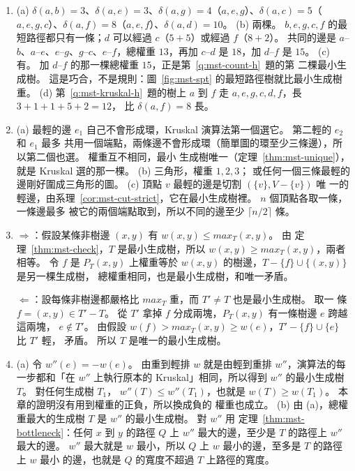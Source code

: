 \begin{enumerate}
\item (a) $\delta(a, b) = 3$、$\delta(a, e) = 3$、$\delta(a, g) = 4$（$a, e, g$）、$\delta(a, c) =
5$（$a, e, g, c$）、$\delta(a, f) = 8$（$a, e, f$）、$\delta(a, d) = 10$。 (b) 兩棵。 $b, e, g, c,
f$ 的最短路徑都只有一條；$d$ 可以經過 $c$（$5 + 5$）或經過 $f$（$8 + 2$）。 共同的邊是
$a$--$b$、$a$--$e$、$e$--$g$、$g$--$c$、$e$--$f$，總權重 $13$，再加 $c$--$d$ 是 $18$，加
$d$--$f$ 是 $15$。 (c) 有。 加 $d$--$f$ 的那一棵總權重 $15$，正是第~\ref{q:mst-count-h}~題的第
二棵最小生成樹。 這是巧合，不是規則：圖~\ref{fig:mst-spt} 的最短路徑樹就比最小生成樹重。 (d)
第~\ref{q:mst-kruskal-h}~題的樹上 $a$ 到 $f$ 走 $a, e, g, c, d, f$，長 $3 + 1 + 1 + 5 + 2 = 12$，
比 $\delta(a, f) = 8$ 長。

\item (a) 最輕的邊 $e_1$ 自己不會形成環，Kruskal 演算法第一個選它。 第二輕的 $e_2$ 和 $e_1$ 最多
共用一個端點，兩條邊不會形成環（簡單圖的環至少三條邊），所以第二個也選。 權重互不相同，最小
生成樹唯一（定理~\ref{thm:mst-unique}），就是 Kruskal 選的那一棵。 (b) 三角形，權重 $1, 2, 3$；
或任何一個三條最輕的邊剛好圍成三角形的圖。 (c) 頂點 $v$ 最輕的邊是切割 $(\{v\}, V - \{v\})$ 唯
一的輕邊，由系理~\ref{cor:mst-cut-strict}，它在最小生成樹裡。 $n$ 個頂點各取一條，一條邊最多
被它的兩個端點取到，所以不同的邊至少 $\lceil n/2 \rceil$ 條。

\item $\Rightarrow$：假設某條非樹邊 $(x, y)$ 有 $w(x, y) \le \mathit{max}_T(x, y)$。 由
定理~\ref{thm:mst-check}，$T$ 是最小生成樹，所以 $w(x, y) \ge \mathit{max}_T(x, y)$，兩者相等。
令 $f$ 是 $P_T(x, y)$ 上權重等於 $w(x, y)$ 的樹邊，$T - \{f\} \cup \{(x, y)\}$ 是另一棵生成樹，
總權重相同，也是最小生成樹，和唯一矛盾。

$\Leftarrow$：設每條非樹邊都嚴格比 $\mathit{max}_T$ 重，而 $T' \ne T$ 也是最小生成樹。 取一
條 $f = (x, y) \in T' - T$。 從 $T'$ 拿掉 $f$ 分成兩塊，$P_T(x, y)$ 有一條樹邊 $e$ 跨越這兩塊，
$e \notin T'$。 由假設 $w(f) > \mathit{max}_T(x, y) \ge w(e)$，$T' - \{f\} \cup \{e\}$ 比 $T'$ 輕，
矛盾。 所以 $T$ 是唯一的最小生成樹。

\item (a) 令 $w''(e) = -w(e)$。 由重到輕排 $w$ 就是由輕到重排 $w''$，演算法的每一步都和「在
$w''$ 上執行原本的 Kruskal」相同，所以得到 $w''$ 的最小生成樹 $T$。 對任何生成樹 $T_1$，
$w''(T) \le w''(T_1)$，也就是 $w(T) \ge w(T_1)$。 本章的證明沒有用到權重的正負，所以換成負的
權重也成立。 (b) 由 (a)，總權重最大的生成樹 $T$ 是 $w''$ 的最小生成樹。 對 $w''$ 用
定理~\ref{thm:mst-bottleneck}：任何 $x$ 到 $y$ 的路徑 $Q$ 上 $w''$ 最大的邊，至少是 $T$ 的路徑上
$w''$ 最大的邊。 $w''$ 最大就是 $w$ 最小，所以 $Q$ 上 $w$ 最小的邊，至多是 $T$ 的路徑上 $w$ 最小
的邊，也就是 $Q$ 的寬度不超過 $T$ 上路徑的寬度。


\end{enumerate}
